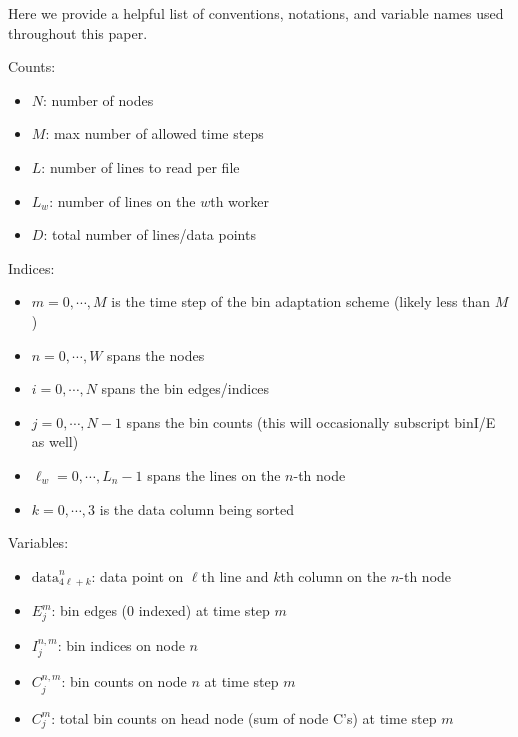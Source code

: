 \documentclass{article}
\begin{document}
Here we provide a helpful list of conventions, notations, and variable names used throughout this paper.

\begin{mdframed}[backgroundcolor=blue!20]
	Counts:
	\setlength\itemsep{0.1pt}
	\setlength\parskip{0.1pt}
	\begin{itemize}
		\setlength\itemsep{0.1pt}
		\setlength\parskip{0.1pt}
		\item $N$: number of nodes
		\item $M$: max number of allowed time steps
		\item $L$: number of lines to read per file
		\item $L_w$: number of lines on the $w$th worker
		\item $D$: total number of lines/data points
	\end{itemize}
\end{mdframed}

\begin{mdframed}[backgroundcolor=blue!20]
	Indices:
	\setlength\itemsep{0.1pt}
	\setlength\parskip{0.1pt}
	\begin{itemize}
		\setlength\itemsep{0.1pt}
		\setlength\parskip{0.1pt}
		\item $m = 0, \cdots, M$ is the time step of the bin adaptation scheme (likely less than $M$)
		\item $n = 0, \cdots, W$ spans the nodes
		\item $i = 0, \cdots, N$ spans the bin edges/indices
		\item $j = 0, \cdots, N-1$ spans the bin counts (this will occasionally subscript binI/E as well)
		\item $\ell_w = 0, \cdots, L_n-1$ spans the lines on the $n$-th node
		\item $k = 0, \cdots, 3$ is the data column being sorted
	\end{itemize}
\end{mdframed}

\begin{mdframed}[backgroundcolor=blue!20]
	Variables:
	\setlength\itemsep{0.1pt}
	\setlength\parskip{0.1pt}
	\begin{itemize}
		\setlength\itemsep{0.1pt}
		\setlength\parskip{0.1pt}
		\item $\textrm{data}^n_{4\ell+k}$: data point on $\ell$th line and $k$th column on the $n$-th node
		\item ${E}^m_j$: bin edges (0 indexed) at time step $m$
		\item ${I}^{n,m}_j$: bin indices on node $n$
		\item ${C}^{n,m}_j$: bin counts on node $n$ at time step $m$
		\item ${C}^m_j$: total bin counts on head node (sum of node C's) at time step $m$
	\end{itemize}
\end{mdframed}
\end{document}
